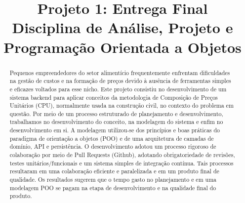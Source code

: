 \documentclass[conference]{IEEEtran}
\begin{document}
\title{Projeto 1: Entrega Final\\
  {\footnotesize Disciplina de Análise, Projeto e Programação
  Orientada a Objetos}
}

\author{
  \and

  \and

}

\maketitle

\begin{abstract}
  Pequenos empreendedores do setor alimentício frequentemente
  enfrentam dificuldades na gestão de custos e na formação de preços
  devido à ausência de ferramentas simples e eficazes voltados para esse nicho.
  Este projeto consistiu no desenvolvimento de um sistema backend
  para aplicar conceitos da metodologia de Composição de Preços
  Unitários (CPU), normalmente usada na construção civil, no contexto
  do problema em questão.
  Por meio de um processo estruturado de planejamento e desenvolvimento,
  trabalhamos no desenvolvimento do conceito, na modelagem do sistema e
  enfim no desenvolvimento em si.
  A modelagem utilizou-se dos princípios e boas práticas do paradigma
  de orientação a objetos (POO) e de uma arquitetura de camadas de domínio,
  API e persistência.
  O desenvolvimento adotou um processo rigoroso de colaboração por
  meio de Pull Requests (Github), adotando obrigatoriedade de revisões,
  testes unitários/funcionais e um sistema simples de integração contínua.
  Tais processos resultaram em uma colaboração eficiente e paralelizada e
  em um produto final de qualidade.
  Os resultados sugerem que o tempo gasto no planejamento e em uma
  modelagem POO se pagam na etapa de desenvolvimento e na qualidade
  final do produto.
\end{abstract}
\end{document}
